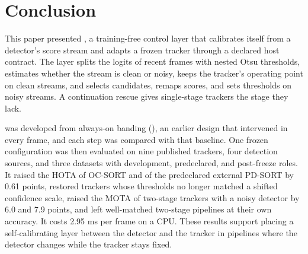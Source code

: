 \section{Conclusion}\label{sec:conclusion}

This paper presented \scl{}, a training-free control layer that calibrates itself
from a detector's score stream and adapts a frozen tracker through a declared
host contract. The layer splits the logits of recent frames with nested Otsu
thresholds, estimates whether the stream is clean or noisy, keeps the
tracker's operating point on clean streams, and selects candidates, remaps
scores, and sets thresholds on noisy streams. A continuation rescue gives
single-stage trackers the stage they lack.

\scl{} was developed from always-on banding (\aob{}), an earlier design that
intervened in every frame, and each step was compared with that baseline. One frozen configuration was then evaluated on
nine published trackers, four detection sources, and three datasets with
development, predeclared, and post-freeze roles. It raised the HOTA of
OC-SORT and of the predeclared external PD-SORT by 0.61 points, restored
trackers whose thresholds no longer matched a shifted confidence scale, raised
the MOTA of two-stage trackers with a noisy detector by 6.0 and 7.9 points,
and left well-matched two-stage pipelines at their own accuracy. It costs
2.95 ms per frame on a CPU. These results support placing a self-calibrating
layer between the detector and the tracker in pipelines where the detector
changes while the tracker stays fixed.
